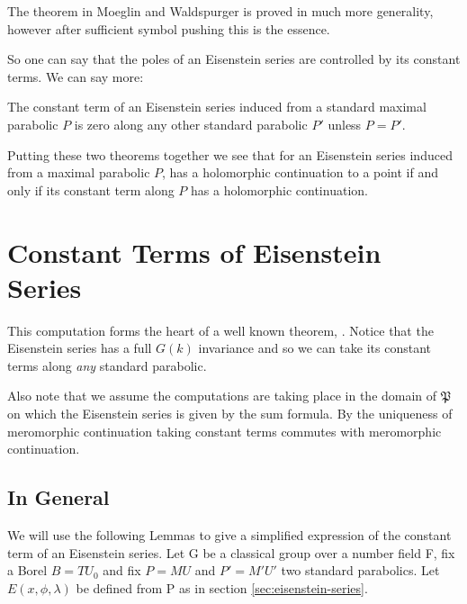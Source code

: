     \begin{remark}
    	The theorem in Moeglin and Waldspurger is proved in much more generality, however after sufficient symbol pushing this is the essence. 
    \end{remark}
    So one can say that the poles of an Eisenstein series are controlled by its constant terms. We can say more:
    
        
        \begin{theorem}
        	The constant term of an Eisenstein series induced from a standard maximal parabolic \(P\) is zero along any other standard parabolic \(P'\) unless \(P = P'\).
        \end{theorem}
        
        Putting these two theorems together we see that for an Eisenstein series induced from a maximal parabolic \(P\), has a holomorphic continuation to a point if and only if its constant term along \(P\) has a holomorphic continuation. 
      
      

\section{Constant Terms of Eisenstein Series}\label{const_eisenstein}
This computation forms the heart of a well known theorem, \cite[Prop 10.4.2]{getzIntroductionAutomorphicRepresentations2024}\cite[II.1.7]{moeglinSpectralDecompositionEisenstein1995}\cite[6.2]{shahidiEisensteinSeriesAutomorphic2010}. Notice that the Eisenstein series has a full \(G(k)\) invariance and so we can take its constant terms along \textit{any} standard parabolic.

Also note that we assume the computations are taking place in the domain of \(\mathfrak{P}\) on which the Eisenstein series is given by the sum formula. By the uniqueness of meromorphic continuation taking constant terms commutes with meromorphic continuation.

\subsection{In General}
We will use the following Lemmas to give a simplified expression of the constant term of an Eisenstein series. Let G be a classical group over a number field F, fix a Borel \(B = TU_0\) and fix \(P = MU\) and \(P' = M'U'\) two standard parabolics. Let \(E(x, \phi, \lambda)\) be defined from P as in section \ref{sec:eisenstein-series}.

